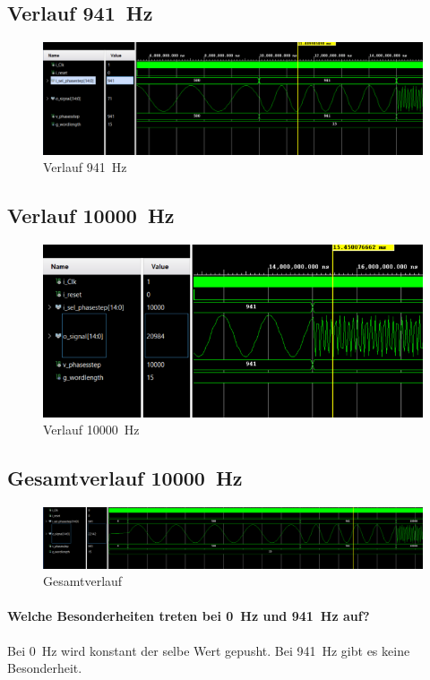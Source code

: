 \documentclass[a4paper,11pt,DIV=11,parskip=half]{scrartcl}
\begin{document}
\subsection{Verlauf \SI{941}{Hz}}
\begin{figure}[H]
	\centering
	\includegraphics[width=\textwidth]{Bilder/DDS_941Hz.png}
	\caption{Verlauf \SI{941}{Hz}}
	\label{fig:tb_941Hz}
\end{figure}
\subsection{Verlauf \SI{10000}{Hz}}
\begin{figure}[H]
	\centering
	\includegraphics[width=\textwidth]{Bilder/DDS_10000Hz.png}
	\caption{Verlauf \SI{10000}{Hz}}
	\label{fig:tb_10000Hz}
\end{figure}
\subsection{Gesamtverlauf \SI{10000}{Hz}}
\begin{figure}[H]
	\centering
	\includegraphics[width=\textwidth]{Bilder/DDS_gesamt.png}
	\caption{Gesamtverlauf}
	\label{fig:tb_DDS_alles}
\end{figure}
\paragraph*{Welche Besonderheiten treten bei \SI{0}{Hz} und \SI{941}{Hz} auf?}
Bei \SI{0}{Hz} wird konstant der selbe Wert gepusht. Bei \SI{941}{Hz} gibt es keine Besonderheit.
\end{document}
